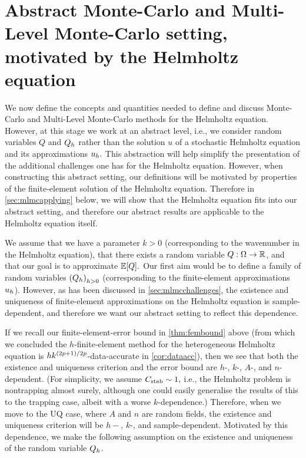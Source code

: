 \section[Abstract MC and MLMC setting]{Abstract Monte-Carlo and Multi-Level Monte-Carlo setting, motivated by the Helmholtz equation}\label{sec:mlmcsetup}
We now define the concepts and quantities needed to define and discuss Monte-Carlo and Multi-Level Monte-Carlo methods for the Helmholtz equation. However, at this stage we work at an abstract level, i.e., we consider random variables $Q$ and $Q_{h}$ rather than the solution $u$ of a stochastic Helmholtz equation and its approximations $u_{h}.$ This abstraction will help simplify the presentation of the additional challenges one has for the Helmholtz equation. However, when constructing this abstract setting, our definitions will be motivated by properties of the finite-element solution of the Helmholtz equation. Therefore in \cref{sec:mlmcapplying} below, we will show that the Helmholtz equation fits into our abstract setting, and therefore our abstract results are applicable to the Helmholtz equation itself.

We assume that we have a parameter $k>0$ (corresponding to the wavenumber in the Helmholtz equation), that there exists a random variable $Q:\Omega\rightarrow\mathbb R$, and that our goal is to approximate $\EXP{Q}.$ Our first aim would be to define a family of random variables $\mleft(\Qh\mright)_{h>0}$ (corresponding to the finite-element approximations $u_{h}$). However, as has been discussed in \cref{sec:mlmcchallenges}, the existence and uniqueness of finite-element approximations on the Helmholtz equation is sample-dependent, and therefore we want our abstract setting to reflect this dependence.

If we recall our finite-element-error bound in \cref{thm:fembound} above (from which we concluded the $h$-finite-element method for the heterogeneous Helmholtz equation is $hk^{(2p+1)/2p}$-data-accurate in \cref{cor:dataacc}), then we see that both the existence and uniqueness criterion and the error bound are $h$-, $k$-, $A$-, and $n$-dependent. (For simplicity, we assume $C_{\mathrm{stab}} \sim 1,$ i.e., the Helmholtz problem is nontrapping almost surely, although one could easily generalise the results of this  to the trapping case, albeit with a worse $k$-dependence.) Therefore, when we move to the UQ case, where $A$ and $n$ are random fields, the existence and uniqueness criterion will be $h-$, $k$-, and sample-dependent. Motivated by this dependence, we make the following assumption on the existence and uniqueness of the random variable $Q_{h}$.

